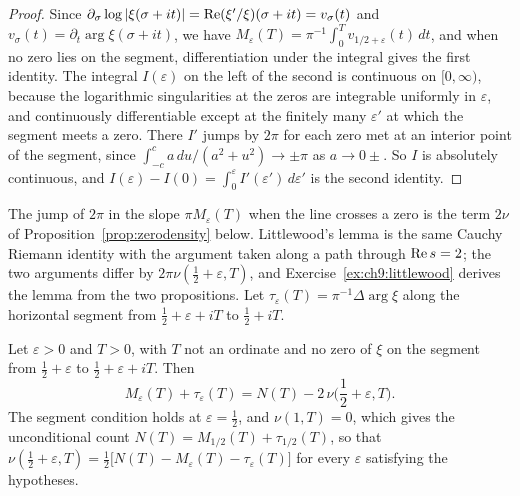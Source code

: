 \begin{proof}
Since $\partial_\sigma\log|\xi(\sigma+it)|=\operatorname{Re}(\xi'/\xi)(\sigma+it)=v_\sigma(t)$ and $v_\sigma(t)=\partial_t\arg\xi(\sigma+it)$, we have $M_\varepsilon(T)=\pi^{-1}\int_0^Tv_{1/2+\varepsilon}(t)\,dt$, and when no zero lies on the segment, differentiation under the integral gives the first identity. The integral $I(\varepsilon)$ on the left of the second is continuous on $[0,\infty)$, because the logarithmic singularities at the zeros are integrable uniformly in $\varepsilon$, and continuously differentiable except at the finitely many $\varepsilon'$ at which the segment meets a zero. There $I'$ jumps by $2\pi$ for each zero met at an interior point of the segment, since $\int_{-c}^{c}a\,du/(a^2+u^2)\to\pm\pi$ as $a\to0\pm$. So $I$ is absolutely continuous, and $I(\varepsilon)-I(0)=\int_0^\varepsilon I'(\varepsilon')\,d\varepsilon'$ is the second identity.
\end{proof}

The jump of $2\pi$ in the slope $\pi M_\varepsilon(T)$ when the line crosses a zero is the term $2\nu$ of Proposition~\ref{prop:zerodensity} below. Littlewood's lemma \cite[Section 9.9]{Titchmarsh} is the same Cauchy Riemann identity with the argument taken along a path through $\operatorname{Re} s=2$; the two arguments differ by $2\pi\nu(\tfrac12+\varepsilon,T)$, and Exercise~\ref{ex:ch9:littlewood} derives the lemma from the two propositions. Let $\tau_\varepsilon(T)=\pi^{-1}\Delta\arg\xi$ along the horizontal segment from $\tfrac12+\varepsilon+iT$ to $\tfrac12+iT$.

\begin{proposition}\label{prop:zerodensity}
Let $\varepsilon>0$ and $T>0$, with $T$ not an ordinate and no zero of $\xi$ on the segment from $\tfrac12+\varepsilon$ to $\tfrac12+\varepsilon+iT$. Then
\[
M_\varepsilon(T)+\tau_\varepsilon(T)=N(T)-2\,\nu\Big(\frac12+\varepsilon,T\Big).
\]
The segment condition holds at $\varepsilon=\tfrac12$, and $\nu(1,T)=0$, which gives the unconditional count $N(T)=M_{1/2}(T)+\tau_{1/2}(T)$, so that $\nu(\tfrac12+\varepsilon,T)=\tfrac12\big[N(T)-M_\varepsilon(T)-\tau_\varepsilon(T)\big]$ for every $\varepsilon$ satisfying the hypotheses.
\end{proposition}

